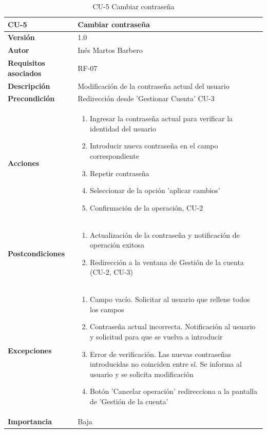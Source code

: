 \begin{table}[p]
	\centering
	\begin{tabularx}{\linewidth}{ p{} p{} }
		\toprule
		\textbf{CU-5}    & \textbf{Cambiar contraseña}\\
		\toprule
		\textbf{Versión}              & 1.0    \\
		\textbf{Autor}                & Inés Martos Barbero \\
		\textbf{Requisitos asociados} & RF-07 \\
		\textbf{Descripción}          & Modificación de la contraseña actual del usuario \\
		\textbf{Precondición}         & Redirección desde 'Gestionar Cuenta' CU-3 \\
		\textbf{Acciones}             &
		\begin{enumerate}
			\def\labelenumi{\arabic{enumi}.}
			\tightlist
			\item Ingresar la contraseña actual para verificar la identidad del usuario
                \item Introducir nueva contraseña en el campo correspondiente
                \item Repetir contraseña
			\item Seleccionar de la opción 'aplicar cambios'
                \item Confirmación de la operación, CU-2
		\end{enumerate}\\
		\textbf{Postcondiciones}        &
		\begin{enumerate}
			\def\labelenumi{\arabic{enumi}.}
			\tightlist
			\item Actualización de la contraseña y notificación de operación exitosa
                \item Redirección a la ventana de Gestión de la cuenta (CU-2, CU-3)
		\end{enumerate}\\
		\textbf{Excepciones}          & 
            \begin{enumerate}
			\def\labelenumi{\arabic{enumi}.}
			\tightlist
			\item Campo vacío. Solicitar al usuario que rellene todos los campos
                \item Contraseña actual incorrecta. Notificación al usuario y solicitud para que se vuelva a introducir
                \item Error de verificación. Las nuevas contraseñas introducidas no coinciden entre sí. Se informa al usuario y se solicita modificación
                \item Botón 'Cancelar operación' redirecciona a la pantalla de 'Gestión de la cuenta'
		\end{enumerate}\\
		\textbf{Importancia}          & Baja \\
		\bottomrule
	\end{tabularx}
	\caption{CU-5 Cambiar contraseña}
    \label{CU-5}
\end{table}

